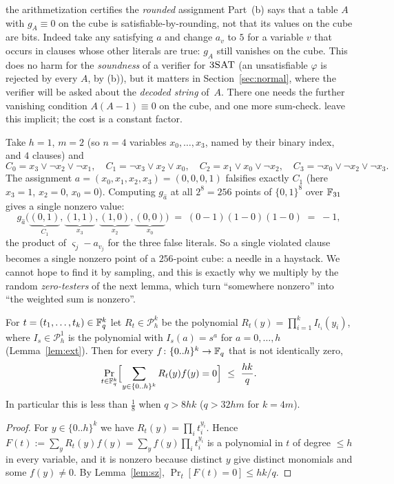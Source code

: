 \begin{pitfall}{the arithmetization certifies the \emph{rounded} assignment}
Part~(b) says that a table $A$ with $g_A\equiv0$ on the cube is satisfiable-by-rounding, not that its values on the cube are bits.  Indeed take any satisfying $a$ and change $a_v$ to $5$ for a variable $v$ that
occurs in clauses whose other literals are true: $g_A$ still vanishes on the cube.  This does no harm for the \emph{soundness} of a verifier for $\textsc{3SAT}$ (an unsatisfiable $\varphi$ is rejected by every $A$, by (b)),
but it matters in Section~\ref{sec:normal}, where the verifier will be asked about the \emph{decoded string} of~$A$.  There one needs the further vanishing condition $A(A-1)\equiv0$ on the cube, and one more sum-check.
\citet{AroraSafra98} leave this implicit; the cost is a constant factor.
\end{pitfall}

\begin{example}\label{ex:arith}
Take $h=1$, $m=2$ (so $n=4$ variables $x_0,\dots,x_3$, named by their binary index, and $4$ clauses) and
\[
  C_0=x_3\vee\neg x_2\vee\neg x_1,\quad C_1=\neg x_3\vee x_2\vee x_0,\quad C_2=x_1\vee x_0\vee\neg x_2,\quad C_3=\neg x_0\vee\neg x_2\vee\neg x_3 .
\]
The assignment $a=(x_0,x_1,x_2,x_3)=(0,0,0,1)$ falsifies exactly $C_1$ (here $x_3=1$, $x_2=0$, $x_0=0$).  Computing $g_{\hat a}$ at all $2^8=256$ points of $\{0,1\}^{8}$
over $\mathbb{F}_{31}$ gives a single nonzero value:
\[
  g_{\hat a}\bigl(\underbrace{(0,1)}_{C_1},\underbrace{(1,1)}_{x_3},\underbrace{(1,0)}_{x_2},\underbrace{(0,0)}_{x_0}\bigr)
  \;=\;(0-1)(1-0)(1-0)\;=\;-1,
\]
the product of $\varsigma_j-a_{v_j}$ for the three false literals.  So a single violated clause becomes a single nonzero point of a $256$-point cube:
a needle in a haystack.  We cannot hope to find it by sampling, and this is exactly why we multiply by the random \emph{zero-testers} of the next lemma, which turn
``somewhere nonzero'' into ``the weighted sum is nonzero''.
\end{example}

\begin{lemma}\label{lem:zt}
For $t=(t_1,\dots,t_{k})\in\mathbb{F}_q^{k}$ let $R_t\in\mathcal P^{k}_h$ be the polynomial $R_t(y)=\prod_{i=1}^{k}I_{t_i}(y_i)$,
where $I_s\in\mathcal P^1_h$ is the polynomial with $I_s(a)=s^a$ for $a=0,\dots,h$ (Lemma~\ref{lem:ext}).  Then for every $f\colon\{0..h\}^{k}\to\mathbb{F}_q$ that is not identically zero,
\[
  \Pr_{t\in\F_q^{k}}\Bigl[\sum_{y\in\{0..h\}^{k}}R_t(y)f(y)=0\Bigr]\ \le\ \frac{hk}{q}.
\]
In particular this is less than $\tfrac18$ when $q>8hk$ ($q>32hm$ for $k=4m$).
\end{lemma}
\begin{proof}
For $y\in\{0..h\}^{k}$ we have $R_t(y)=\prod_it_i^{y_i}$.  Hence $F(t):=\sum_yR_t(y)f(y)=\sum_yf(y)\prod_it_i^{y_i}$ is a polynomial in $t$ of degree $\le h$ in every variable, and it is
nonzero because distinct $y$ give distinct monomials and some $f(y)\ne0$.  By Lemma~\ref{lem:sz}, $\Pr_t[F(t)=0]\le hk/q$.
\end{proof}

